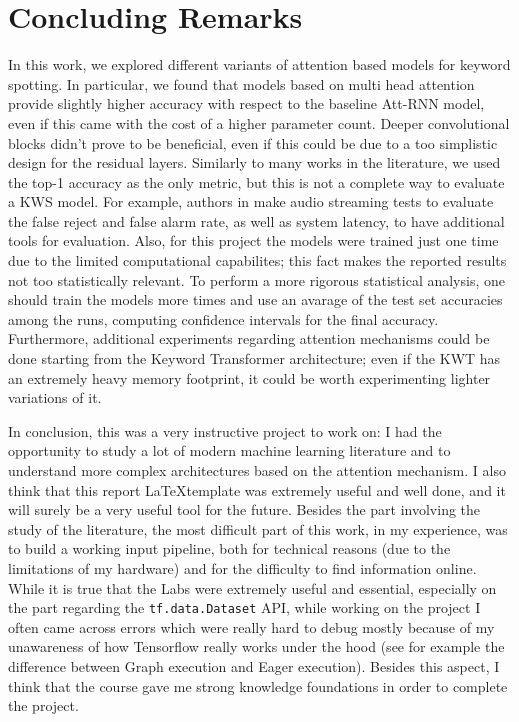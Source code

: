 
\section{Concluding Remarks}

In this work, we explored different variants of attention based models for keyword spotting. In particular, we found that models based on multi head attention provide slightly higher accuracy with respect to the baseline Att-RNN  model, even if this came with the cost of a higher parameter count. Deeper convolutional blocks didn't prove to be beneficial, even if this could be due to a too simplistic design for the residual layers. Similarly to many works in the literature, we used the top-1 accuracy as the only metric, but this is not a complete way to evaluate a KWS model. For example, authors in \cite{dnns2014chen}\cite{convnns2015sainath}\cite{streamingkws2020Rybakov} make audio streaming tests to evaluate the false reject and false alarm rate, as well as system latency, to have additional tools for evaluation. Also, for this project the models were trained just one time due to the limited computational capabilites; this fact makes the reported results not too statistically relevant. To perform a more rigorous statistical analysis, one should train the models more times and use an avarage of the test set accuracies among the runs, computing confidence intervals for the final accuracy. Furthermore, additional experiments regarding attention mechanisms could be done starting from the Keyword Transformer architecture; even if the KWT has an extremely heavy memory footprint, it could be worth experimenting lighter variations of it.

In conclusion, this was a very instructive project to work on: I had the opportunity to study a lot of modern machine learning literature and to understand more complex architectures based on the attention mechanism. I also think that this report \LaTeX template was extremely useful and well done, and it will surely be a very useful tool for the future. Besides the part involving the study of the literature, the most difficult part of this work, in my experience, was to build a working input pipeline, both for technical reasons (due to the limitations of my hardware) and for the difficulty to find information online. While it is true that the Labs were extremely useful and essential, especially on the part regarding the \verb|tf.data.Dataset| API, while working on the project I often came across errors which were really hard to debug mostly because of my unawareness of how Tensorflow really works under the hood (see for example the difference between Graph execution and Eager execution). Besides this aspect, I think that the course gave me strong knowledge foundations in order to complete the project.

